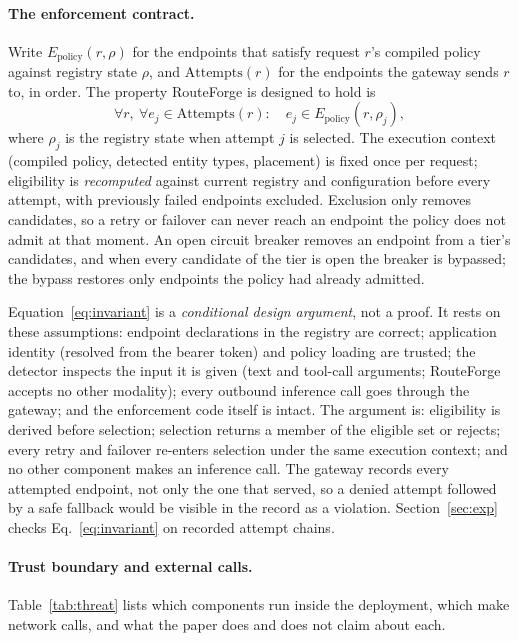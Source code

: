 \documentclass[11pt]{article}
\begin{document}
\paragraph{The enforcement contract.} Write $E_{\mathrm{policy}}(r, \rho)$ for the endpoints
that satisfy request $r$'s compiled policy against registry state $\rho$, and
$\mathrm{Attempts}(r)$ for the endpoints the gateway sends $r$ to, in order. The property
RouteForge is designed to hold is
\begin{equation}
  \forall r,\ \forall e_j \in \mathrm{Attempts}(r):\quad e_j \in E_{\mathrm{policy}}(r, \rho_j),
  \label{eq:invariant}
\end{equation}
where $\rho_j$ is the registry state when attempt $j$ is selected. The execution context
(compiled policy, detected entity types, placement) is fixed once per request; eligibility is
\emph{recomputed} against current registry and configuration before every attempt, with
previously failed endpoints excluded. Exclusion only removes candidates, so a retry or failover
can never reach an endpoint the policy does not admit at that moment. An open circuit breaker
removes an endpoint from a tier's candidates, and when every candidate of the tier is open the
breaker is bypassed; the bypass restores only endpoints the policy had already admitted.

Equation~\eqref{eq:invariant} is a \emph{conditional design argument}, not a proof. It rests on
these assumptions: endpoint declarations in the registry are correct; application identity
(resolved from the bearer token) and policy loading are trusted; the detector inspects the
input it is given (text and tool-call arguments; RouteForge accepts no other modality); every
outbound inference call goes through the gateway; and the enforcement code itself is intact.
The argument is: eligibility is derived before selection; selection returns a member of the
eligible set or rejects; every retry and failover re-enters selection under the same execution
context; and no other component makes an inference call. The gateway records every attempted
endpoint, not only the one that served, so a denied attempt followed by a safe fallback would
be visible in the record as a violation. Section~\ref{sec:exp} checks
Eq.~\eqref{eq:invariant} on recorded attempt chains.

\paragraph{Trust boundary and external calls.} Table~\ref{tab:threat} lists which components
run inside the deployment, which make network calls, and what the paper does and does not
claim about each.
\end{document}
